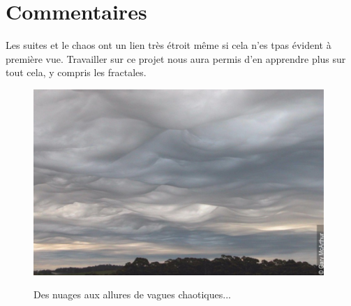 \documentclass[french,11pt]{report}
\begin{document}
\chapter{Commentaires}

Les suites et le chaos ont un lien très étroit même si cela n'es tpas évident à première vue. Travailler sur ce projet nous aura permis d'en apprendre plus sur tout cela, y compris les fractales.

\vspace*{40mm}

\begin{figure} [!h]
    \centering
    \includegraphics[width=11cm]{nuages}
    \label{fig:nuages}
    \caption{Des nuages aux allures de vagues chaotiques...}
\end{figure}
\end{document}

